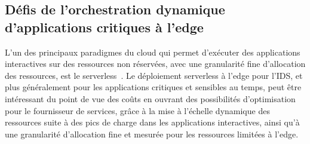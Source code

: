 \subsection{Défis de l'orchestration dynamique d'applications critiques à l'edge}

L'un des principaux paradigmes du cloud qui permet d'exécuter des applications interactives sur des ressources non réservées, avec une granularité fine d'allocation des ressources, est le serverless~\cite{Lannurien2023}. Le déploiement serverless à l'edge pour l'\gls{IDS}, et plus généralement pour les applications critiques et sensibles au temps, peut être intéressant du point de vue des coûts en ouvrant des possibilités d'optimisation pour le fournisseur de services, grâce à la mise à l'échelle dynamique des ressources suite à des pics de charge dans les applications interactives, ainsi qu'à une granularité d'allocation fine et mesurée pour les ressources limitées à l'edge.

